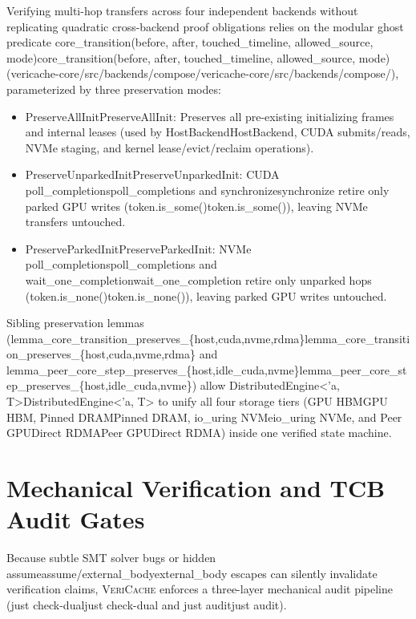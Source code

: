 \documentclass[11pt,a4paper]{article}
\let\origunderscore\_
\DeclareRobustCommand{\code}[1]{{\ttfamily\ifmmode #1\else\def\_{\origunderscore\hspace{0pt}}#1\fi}}
\newcommand{\VC}{\textsc{VeriCache}}
\begin{document}
Verifying multi-hop transfers across four independent backends without replicating quadratic cross-backend proof obligations relies on the modular ghost predicate \code{core\_transition(before, after, touched\_timeline, allowed\_source, mode)} (\code{vericache-core/\allowbreak src/\allowbreak backends/\allowbreak compose/}), parameterized by three preservation modes:
\begin{itemize}
  \item \code{PreserveAllInit}: Preserves all pre-existing initializing frames and internal leases (used by \code{HostBackend}, CUDA submits/reads, NVMe staging, and kernel lease/evict/reclaim operations).
  \item \code{PreserveUnparkedInit}: CUDA \code{poll\_completions} and \code{synchronize} retire only parked GPU writes (\code{token.is\_some()}), leaving NVMe transfers untouched.
  \item \code{PreserveParkedInit}: NVMe \code{poll\_completions} and \code{wait\_one\_completion} retire only unparked hops (\code{token.is\_none()}), leaving parked GPU writes untouched.
\end{itemize}
Sibling preservation lemmas (\code{lemma\_core\_transition\_preserves\_\{host,cuda,nvme,rdma\}} and \code{lemma\_peer\_core\_step\_preserves\_\{host,idle\_cuda,nvme\}}) allow \code{DistributedEngine<'a, T>} to unify all four storage tiers (\code{GPU HBM}, \code{Pinned DRAM}, \code{io\_uring NVMe}, and \code{Peer GPUDirect RDMA}) inside one verified state machine.

\section{Mechanical Verification and TCB Audit Gates}
\label{sec:audit}

Because subtle SMT solver bugs or hidden \code{assume}/\code{external\_body} escapes can silently invalidate verification claims, \VC{} enforces a three-layer mechanical audit pipeline (\code{just check-dual} and \code{just audit}).
\end{document}
